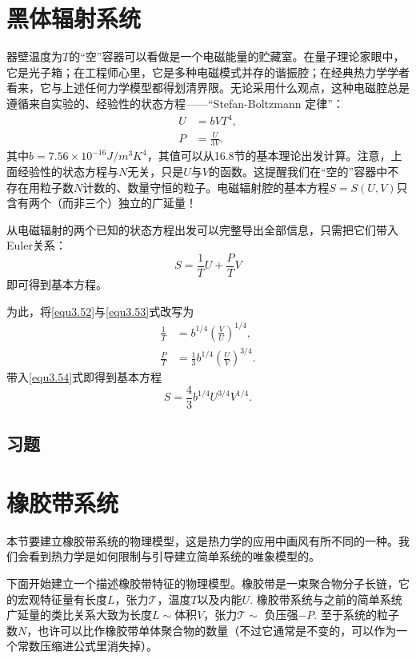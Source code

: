 \section{黑体辐射系统}
\label{sec3.6}
器壁温度为$T$的“空”容器可以看做是一个电磁能量的贮藏室。在量子理论家眼中，它是光子箱；在工程师心里，它是多种电磁模式并存的谐振腔；在经典热力学学者看来，它与上述任何力学模型都得划清界限。无论采用什么观点，这种电磁腔总是遵循来自实验的、经验性的状态方程——“Stefan-Boltzmann 定律”：
\begin{align}
    U &= bVT^4, \label{equ3.52} \\
    P &= \frac{U}{3V}. \label{equ3.53}
\end{align}
其中$b = 7.56 \times 10^{-16} \si{J / m^3 K^4}$，其值可以从16.8节的基本理论出发计算。注意，上面经验性的状态方程与$N$无关，只是$U$与$V$的函数。这提醒我们在“空的”容器中不存在用粒子数$N$计数的、数量守恒的粒子。电磁辐射腔的基本方程$S = S(U, V)$只含有两个（而非三个）独立的广延量！

从电磁辐射的两个已知的状态方程出发可以完整导出全部信息，只需把它们带入Euler关系：
\begin{equation}
    S = \frac{1}{T} U + \frac{P}{T} V
    \label{equ3.54}
\end{equation}
即可得到基本方程。

为此，将\eqref{equ3.52}与\eqref{equ3.53}式改写为
\begin{align}
    \frac{1}{T} &= b^{1/4} \left( \frac{V}{U} \right)^{1/4}, \label{equ3.55} \\
    \frac{P}{T} &= \frac{1}{3} b^{1/4} \left( \frac{U}{V} \right)^{3/4}. \label{equ3.56}
\end{align}
带入\eqref{equ3.54}式即得到基本方程
\begin{equation}
    S = \frac{4}{3} b^{1/4} U^{3/4} V^{1/4}.
\label{equ3.57}
\end{equation}

\subsection*{习题}


\section{橡胶带系统}
\label{sec3.7}
本节要建立橡胶带系统的物理模型，这是热力学的应用中画风有所不同的一种。我们会看到热力学是如何限制与引导建立简单系统的唯象模型的。

下面开始建立一个描述橡胶带特征的物理模型。橡胶带是一束聚合物分子长链，它的宏观特征量有长度$L$，张力$\mathscr{T}$，温度$T$以及内能$U$. 橡胶带系统与之前的简单系统广延量的类比关系大致为长度$L \sim $体积$V$，张力$\mathscr{T} \sim$ 负压强$-P$. 至于系统的粒子数$N$，也许可以比作橡胶带单体聚合物的数量（不过它通常是不变的，可以作为一个常数压缩进公式里消失掉）。

